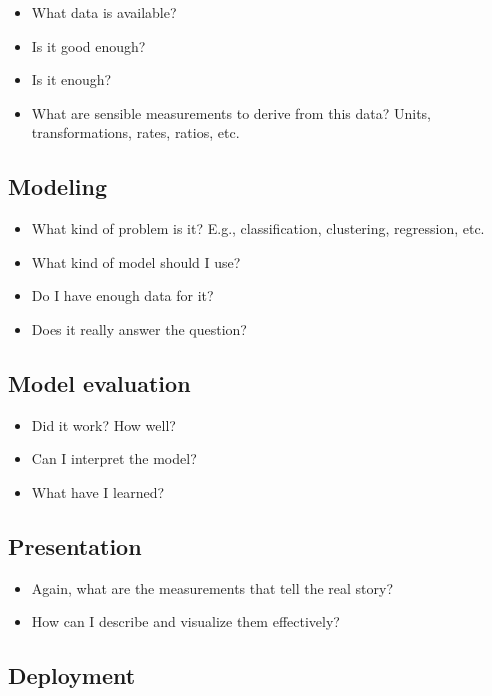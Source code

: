 \documentclass[]{book}
\providecommand{\tightlist}{%
  \setlength{\itemsep}{0pt}\setlength{\parskip}{0pt}}
\theoremstyle{definition}
\theoremstyle{definition}
\theoremstyle{remark}
\begin{document}
\begin{itemize}
\tightlist
\item
  What data is available?
\item
  Is it good enough?
\item
  Is it enough?
\item
  What are sensible measurements to derive from this data? Units,
  transformations, rates, ratios, etc.
\end{itemize}

\subsection{Modeling}\label{modeling}

\begin{itemize}
\tightlist
\item
  What kind of problem is it? E.g., classification, clustering,
  regression, etc.
\item
  What kind of model should I use?
\item
  Do I have enough data for it?
\item
  Does it really answer the question?
\end{itemize}

\subsection{Model evaluation}\label{model-evaluation}

\begin{itemize}
\tightlist
\item
  Did it work? How well?
\item
  Can I interpret the model?
\item
  What have I learned?
\end{itemize}

\subsection{Presentation}\label{presentation}

\begin{itemize}
\tightlist
\item
  Again, what are the measurements that tell the real story?
\item
  How can I describe and visualize them effectively?
\end{itemize}

\subsection{Deployment}\label{deployment}
\end{document}
